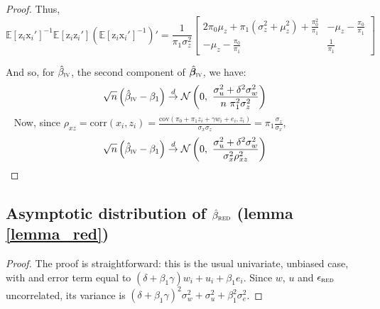 \documentclass[usletter, 12pt]{article}
\begin{document}
\begin{proof}
		Thus, 
			\[
				     \mathbb{E}[\text{z}_{i}\text{x}_i']^{-1}\mathbb{E}[\text{z}_{i}\text{z}_i']  \left( \mathbb{E}[\text{z}_{i}\text{x}_i']^{-1} \right)' 
				     		= \dfrac{1}{\pi_1 \sigma_{z}^{2}} 
				     			\begin{bmatrix}
								2 \pi_0 \mu_z + \pi_1(\sigma_{z}^{2} + \mu_{z}^{2}) + \frac{\pi_0^2}{\pi_1}&   -\mu_{z} -  \frac{\pi_0}{\pi_1} \\ 
								  -\mu_{z} -  \frac{\pi_0}{\pi_1} & \frac{1}{\pi_1}
							\end{bmatrix} 
			\]
			
			And so, for $\hat{\beta}_{\textsc{iv}}$, the second component of $\hat{\bm{\beta}}_{\textsc{iv}}$, we have:
				\begin{equation}
					\sqrt{n}\left( \hat{\beta}_{\textsc{iv}} - \beta_{1} \right)
					\overset{d}{\to}
					\mathcal{N}\left( 0 , \ \dfrac{\sigma_{u}^{2} + \delta^{2}\sigma_{w}^{2}}{n \ \pi_{1}^{2}\sigma_{z}^{2}} \right) 
				\end{equation}
				~
				Now, since $ \rho_{xz} = \text{corr}(x_{i}, z_{i}) =  \frac{\text{cov}( \pi_0 + \pi_1 z_i + \gamma w_{i} + e_{i} , z_i)}{\sigma_x \sigma_z} = \pi_1 \frac{\sigma_z}{\sigma_x}$,
				~
				\[
						\sqrt{n}\left( \hat{\beta}_{\textsc{iv}} - \beta_{1} \right)
						\overset{d}{\to}
							 \mathcal{N}\left( 0 , \ \dfrac{\sigma_{u}^{2} + \delta^{2}\sigma_{w}^{2}}{\sigma_{x}^{2} \rho_{xz}^{2}} \right) 
				\]
			\end{proof}
				


\subsection{Asymptotic distribution of $\hat{\beta}_{\textsc{red}}$ (lemma \ref{lemma_red})}
				
			\begin{proof}
				The proof is straightforward: this is the usual univariate, unbiased case, with and error term equal to $(\delta + \beta_{1}\gamma) w_{i} + u_{i} + \beta_{1}e_{i}$. Since $w$, $u$ and $\epsilon_{\textsc{red}}$ uncorrelated, its variance is $(\delta + \beta_{1}\gamma)^{2} \sigma_{w}^{2} + \sigma_{u}^{2} + \beta_{1}^{2}\sigma_{e}^{2}$.
			\end{proof}
		
\end{document}
